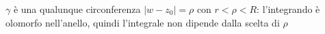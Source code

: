 \documentclass[preview]{standalone}
\begin{document}
\begin{center}
$\gamma$ è una qualunque circonferenza $|w-z_0|=\rho$ con $r<\rho<R$: l'integrando è olomorfo nell'anello, quindi l'integrale non dipende dalla scelta di $\rho$
\end{center}
\end{document}
